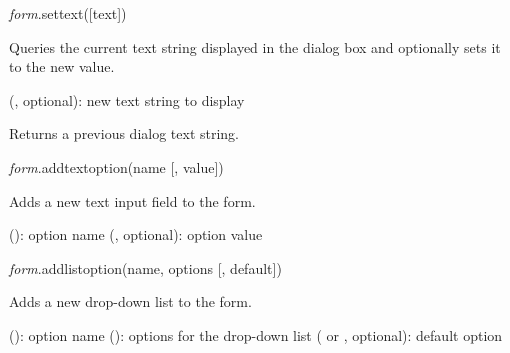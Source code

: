 \documentclass[a4paper,12pt,twoside,extrafontsizes]{memoir}
\begin{document}

\begin{luafuncprototype}
\emph{form}.settext([text])
\end{luafuncprototype}

\begin{funcdescr}
	Queries the current text string displayed in the dialog box and optionally sets it to the new value.
\end{funcdescr}

\begin{funcparams}
	 (, optional): new text string to display
\end{funcparams}

\begin{funcret}
	Returns a previous dialog text string.
\end{funcret}


\begin{luafuncprototype}
\emph{form}.addtextoption(name [, value])
\end{luafuncprototype}

\begin{funcdescr}
	Adds a new text input field to the form.
\end{funcdescr}

\begin{funcparams}
	 (): option name
	 (, optional): option value
\end{funcparams}


\begin{luafuncprototype}
	\emph{form}.addlistoption(name, options [, default])
\end{luafuncprototype}

\begin{funcdescr}
	Adds a new drop-down list to the form.
\end{funcdescr}

\begin{funcparams}
	 (): option name
	 (): options for the drop-down list
	 ( or , optional): default option
\end{funcparams}
\end{document}
